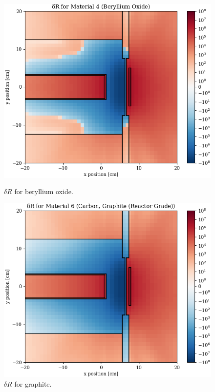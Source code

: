 \begin{figure}
  \begin{minipage}{0.49\linewidth}
    \centering
    \includegraphics[width=\linewidth]{content/testprob/dR_04.png}
    \caption{$\delta R$ for beryllium oxide.}
    \label{fig:tp:dR_04}
  \end{minipage}
  \hfill
  \begin{minipage}{0.49\linewidth}
    \centering
    \includegraphics[width=\linewidth]{content/testprob/dR_06.png}
    \caption{$\delta R$ for graphite.}
    \label{fig:tp:dR_06}
  \end{minipage}
\end{figure}

